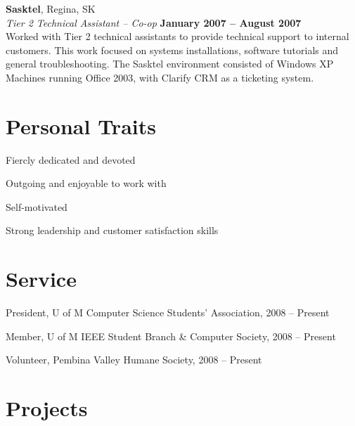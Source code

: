 \documentclass[margin,line,letterpaper]{resume}
\begin{document}
\begin{resume}
  {\bf Sasktel}, Regina, SK \vspace{2mm}\\\vspace{1mm}%
  {\sl Tier 2 Technical Assistant -- Co-op} \hfill {\bf January 2007 -- August 2007}\\
  Worked with Tier 2 technical assistants to provide technical support to internal customers. This work focused on systems installations, software tutorials and general troubleshooting. The Sasktel environment consisted of Windows XP Machines running Office 2003, with Clarify CRM as a ticketing system.

  \section{\mysidestyle Personal Traits}

  \begin{list2}
    \item Fiercly dedicated and devoted
    \item Outgoing and enjoyable to work with
    \item Self-motivated
    \item Strong leadership and customer satisfaction skills
  \end{list2}

  \section{\mysidestyle Service}

  \begin{list2}
    \item President, U of M Computer Science Students' Association, 2008 -- Present
    \item Member, U of M IEEE Student Branch \& Computer Society, 2008 -- Present
    \item Volunteer, Pembina Valley Humane Society, 2008 -- Present
  \end{list2}

  \newpage
  \section{\mysidestyle Projects}


\end{resume}
\end{document}
